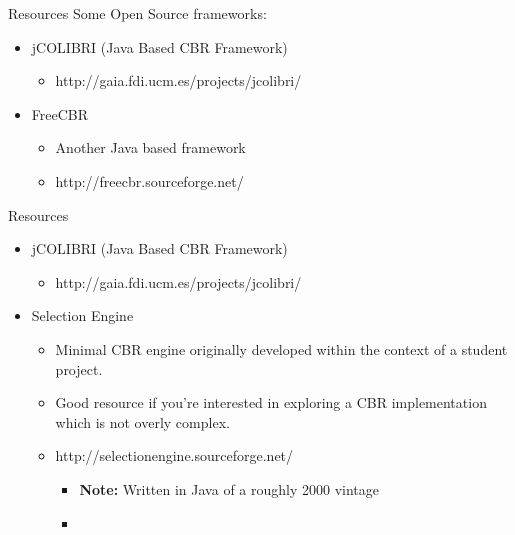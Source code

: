 \documentclass[%
pdf,
colorBG,
slideColor,
tcrico,
]{prosper}
\begin{document}



\begin{slide}{Resources}
Some Open Source frameworks:
	\begin{itemize}
	\item jCOLIBRI (Java Based CBR Framework)
		\begin{itemize}		
		\item http://gaia.fdi.ucm.es/projects/jcolibri/
		\end{itemize}
	\item FreeCBR
		\begin{itemize}
		\item Another Java based framework
		\item http://freecbr.sourceforge.net/
		\end{itemize}
	\end{itemize}
\end{slide}


\begin{slide}{Resources}
	\begin{itemize}
	\item jCOLIBRI (Java Based CBR Framework)
		\begin{itemize}		
		\item http://gaia.fdi.ucm.es/projects/jcolibri/
		\end{itemize}
\item Selection Engine
		\begin{itemize}
		\item Minimal CBR engine originally developed within the context of a student project.
		\item Good resource if you're interested in exploring a CBR implementation which is not overly complex.
		\item http://selectionengine.sourceforge.net/
			\begin{itemize}
			\item \textbf{Note:} Written in Java of a roughly 2000 vintage
			\item 
		\end{itemize}
	\end{itemize}

	\end{itemize}
\end{slide}
\end{document}
